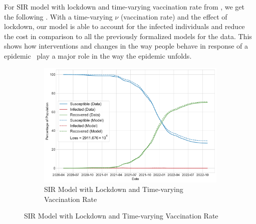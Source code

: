 \documentclass[tikz,fleqn,12pt]{wlscirep}
\begin{document}
For SIR model with lockdown and time-varying vaccination rate from , we get the following . With a time-varying $\nu$ (vaccination rate) and the effect of lockdown, our model is able to account for the infected individuals and reduce the cost in comparison to all the previously formalized models for the data. This shows how interventions and changes in the way people behave in response of a epidemic~\cite{Caldwell2021} play a major role in the way the epidemic unfolds.

\begin{figure}[htbp!]
  \centering
  \begin{subfigure}[t]{\textwidth}
    \centering
    \includegraphics[scale=0.50]{images/SIR_model_with_lockdown_with_vaccination_time_varying_nu_IND.pdf}
    \caption{SIR Model with Lockdown and Time-varying Vaccination Rate}
    \label{fig:SIR_model_with_lockdown_with_vaccination_time_varying_nu_IND}
  \end{subfigure}


\end{figure}
\end{document}
